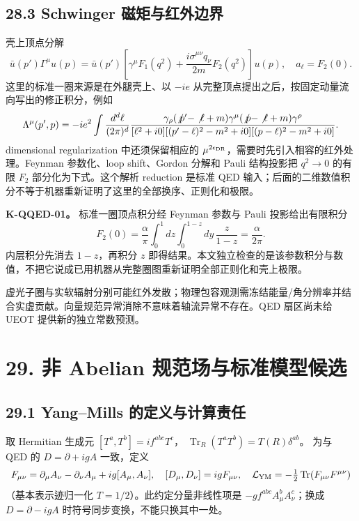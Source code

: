 \documentclass[
  11pt,
  oneside]{book}
\begin{document}
\hypertarget{schwinger-ux78c1ux77e9ux4e0eux7ea2ux5916ux8fb9ux754c}{%
\section{28.3 Schwinger
磁矩与红外边界}\label{schwinger-ux78c1ux77e9ux4e0eux7ea2ux5916ux8fb9ux754c}}

壳上顶点分解 \[
\bar u(p')\Gamma^\mu u(p)=\bar u(p')
\left[\gamma^\mu F_1(q^2)
+\frac{i\sigma^{\mu\nu}q_\nu}{2m}F_2(q^2)\right]u(p),
\quad a_\ell=F_2(0).
\] 这里的标准一圈来源是在外腿壳上、以 \(-ie\)
从完整顶点提出之后，按固定动量流向写出的修正积分，例如 \[
\Lambda^\mu(p',p)=-ie^2\int\frac{d^d\ell}{(2\pi)^d}
\frac{\gamma_\rho(\not p'-\not\ell+m)\gamma^\mu
(\not p-\not\ell+m)\gamma^\rho}
{[\ell^2+i0][(p'-\ell)^2-m^2+i0][(p-\ell)^2-m^2+i0]}.
\] dimensional regularization 中还须保留相应的
\(\mu^{2\epsilon_{\rm DR}}\)，需要时先引入相容的红外处理。Feynman
参数化、loop shift、Gordon 分解和 Pauli 结构投影把 \(q^2\to0\) 的有限
\(F_2\) 部分化为下式。这个解析 reduction 是标准 QED
输入；后面的二维数值积分不等于机器重新证明了这里的全部换序、正则化和极限。

\textbf{K-QQED-01。} 标准一圈顶点积分经 Feynman 参数与 Pauli
投影给出有限积分 \[
F_2(0)=\frac{\alpha}{\pi}
\int_0^1dz\int_0^{1-z}dy\,\frac{z}{1-z}
=\frac{\alpha}{2\pi}.
\] 内层积分先消去 \(1-z\)，再积分 \(z\)
即得结果。本文独立检查的是该参数积分与数值，不把它说成已用机器从完整圈图重新证明全部正则化和壳上极限。

虚光子圈与实软辐射分别可能红外发散；物理包容观测需冻结能量/角分辨率并结合实虚贡献。向量规范异常消除不意味着轴流异常不存在。QED
扇区尚未给 UEOT 提供新的独立常数预测。

\hypertarget{ch-29}{%
\chapter{29. 非 Abelian 规范场与标准模型候选}\label{ch-29}}

\hypertarget{yangmills-ux7684ux5b9aux4e49ux4e0eux8ba1ux7b97ux8d23ux4efb}{%
\section{29.1 Yang--Mills
的定义与计算责任}\label{yangmills-ux7684ux5b9aux4e49ux4e0eux8ba1ux7b97ux8d23ux4efb}}

取 Hermitian 生成元 \([T^a,T^b]=if^{abc}T^c\)，
\(\operatorname{Tr}_R(T^aT^b)=T(R)\delta^{ab}\)。 为与 QED 的
\(D=\partial+igA\) 一致，定义 \[
F_{\mu\nu}=\partial_\mu A_\nu-\partial_\nu A_\mu+ig[A_\mu,A_\nu],
\quad [D_\mu,D_\nu]=igF_{\mu\nu},
\quad\mathcal L_{\rm YM}=-\tfrac12\operatorname{Tr}(F_{\mu\nu}F^{\mu\nu})
\] （基本表示迹归一化 \(T=1/2\)）。此约定分量非线性项是
\(-g f^{abc}A_\mu^bA_\nu^c\)；换成 \(D=\partial-igA\)
时符号同步变换，不能只换其中一处。
\end{document}
